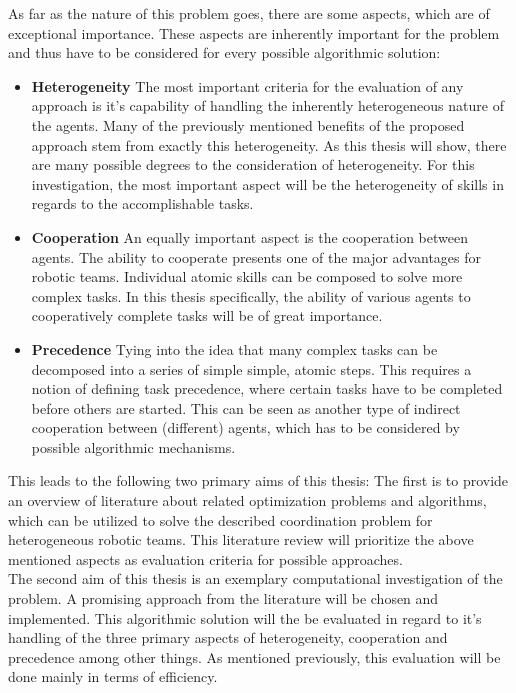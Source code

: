 As far as the nature of this problem goes, there are some aspects, which are of exceptional importance. These aspects are inherently important for the problem and thus have to be considered for every possible algorithmic solution:
\begin{itemize}
\item \textbf{Heterogeneity} The most important criteria for the evaluation of any approach is it's capability of handling the inherently heterogeneous nature of the agents. Many of the previously mentioned benefits of the proposed approach stem from exactly this heterogeneity. As this thesis will show, there are many possible degrees to the consideration of heterogeneity. For this investigation, the most important aspect will be the heterogeneity of skills in regards to the accomplishable tasks.
\item \textbf{Cooperation} An equally important aspect is the cooperation between agents. The ability to cooperate presents one of the major advantages for robotic teams. Individual atomic skills can be composed to solve more complex tasks. In this thesis specifically,  the ability of various agents to cooperatively complete tasks will be of great importance.
\item \textbf{Precedence} Tying into the idea that many complex tasks can be decomposed into a series of simple simple, atomic steps. This requires a notion of defining task precedence, where certain tasks have to be completed before others are started. This can be seen as another type of indirect cooperation between (different) agents, which has to be considered by possible algorithmic mechanisms.
\end{itemize} 
This leads to the following two primary aims of this thesis: The first is to provide an overview of literature about related optimization problems and algorithms, which can be utilized to solve the described coordination problem for heterogeneous robotic teams. This literature review will prioritize the above mentioned aspects as evaluation criteria for possible approaches.\\
The second aim of this thesis is an exemplary computational investigation of the problem. A promising approach from the literature will be chosen and implemented. This algorithmic solution will the be evaluated in regard to it's handling of the three primary aspects of heterogeneity, cooperation and precedence among other things. As mentioned previously, this evaluation will be done mainly in terms of efficiency.


